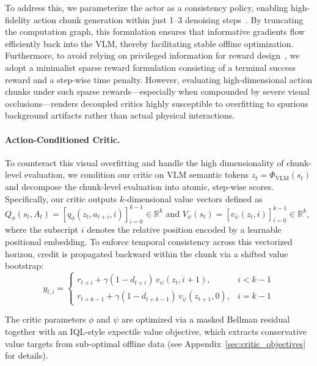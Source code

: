 \documentclass{article}
\begin{document}
To address this, we parameterize the actor as a consistency policy, enabling high-fidelity action chunk generation within just 1--3 denoising steps~\cite{prasad2024consistency,lu2024manicm}. By truncating the computation graph, this formulation ensures that informative gradients flow efficiently back into the VLM, thereby facilitating stable offline optimization. Furthermore, to avoid relying on privileged information for reward design~\cite{Rajeswaran-RSS-18}, we adopt a minimalist sparse reward formulation consisting of a terminal success reward and a step-wise time penalty. However, evaluating high-dimensional action chunks under such sparse rewards---especially when compounded by severe visual occlusions---renders decoupled critics highly susceptible to overfitting to spurious background artifacts rather than actual physical interactions.
\vspace{-3mm}
\paragraph{Action-Conditioned Critic.} To counteract this visual overfitting and handle the high dimensionality of chunk-level evaluation, we condition our critic on VLM semantic tokens $z_t = \Phi_{\mathrm{VLM}}(s_t)$ and decompose the chunk-level evaluation into atomic, step-wise scores. Specifically, our critic outputs $k$-dimensional value vectors defined as $Q_\phi(s_t, A_t) = [ q_\phi(z_t, a_{t+i}, i) ]_{i=0}^{k-1} \in \mathbb{R}^k$ and $V_\psi(s_t) = [ v_\psi(z_t, i) ]_{i=0}^{k-1} \in \mathbb{R}^k$, where the subscript $i$ denotes the relative position encoded by a learnable positional embedding. To enforce temporal consistency across this vectorized horizon, credit is propagated backward within the chunk via a shifted value bootstrap:
\begin{equation}
y_{t,i} = \begin{cases} 
r_{t+i} + \gamma (1-d_{t+i}) \, v_\psi(z_t, i+1), & i < k-1 \\ 
r_{t+k-1} + \gamma (1-d_{t+k-1}) \, v_\psi(z_{t+1}, 0), & i = k-1 
\end{cases}
\end{equation}

The critic parameters $\phi$ and $\psi$ are optimized via a masked Bellman residual together with an IQL-style expectile value objective, which extracts conservative value targets from sub-optimal offline data (see Appendix~\ref{sec:critic_objectives} for details).
\vspace{-3mm}
\end{document}
